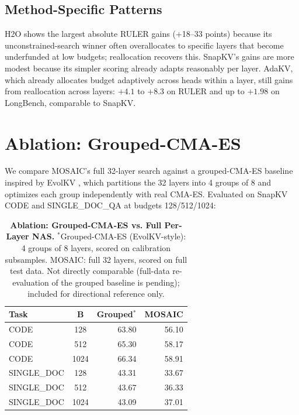 \documentclass[11pt]{article}
\begin{document}
\subsection{Method-Specific Patterns}

H2O shows the largest absolute RULER gains (+18–33 points) because its unconstrained-search winner often overallocates to specific layers that become underfunded at low budgets; reallocation recovers this. SnapKV's gains are more modest because its simpler scoring already adapts reasonably per layer. AdaKV, which already allocates budget adaptively across heads within a layer, still gains from reallocation across layers: $+4.1$ to $+8.3$ on RULER and up to $+1.98$ on LongBench, comparable to SnapKV.

\section{Ablation: Grouped-CMA-ES}

We compare MOSAIC's full 32-layer search against a grouped-CMA-ES baseline inspired by EvolKV \citep{yu2025evolkv}, which partitions the 32 layers into 4 groups of 8 and optimizes each group independently with real CMA-ES. Evaluated on SnapKV CODE and SINGLE\_DOC\_QA at budgets 128/512/1024:

\begin{table}[t]
  \centering
  \small
  \setlength{\tabcolsep}{8pt}
  \begin{tabular}{@{} l c r r @{}}
    \toprule
    \textbf{Task} & \textbf{B} & \textbf{Grouped}$^*$ & \textbf{MOSAIC} \\
    \midrule
    \rowcolor{gray!10}
    CODE & 128 & 63.80 & 56.10 \\
    CODE & 512 & 65.30 & 58.17 \\
    \rowcolor{gray!10}
    CODE & 1024 & 66.34 & 58.91 \\
    SINGLE\_DOC & 128 & 43.31 & 33.67 \\
    \rowcolor{gray!10}
    SINGLE\_DOC & 512 & 43.67 & 36.33 \\
    SINGLE\_DOC & 1024 & 43.09 & 37.01 \\
    \bottomrule
  \end{tabular}
  \caption{\textbf{Ablation: Grouped-CMA-ES vs. Full Per-Layer NAS.} $^*$Grouped-CMA-ES (EvolKV-style): 4 groups of 8 layers, scored on calibration subsamples. MOSAIC: full 32 layers, scored on full test data. Not directly comparable (full-data re-evaluation of the grouped baseline is pending); included for directional reference only.}
  \label{tab:ablation}
\end{table}
\end{document}

